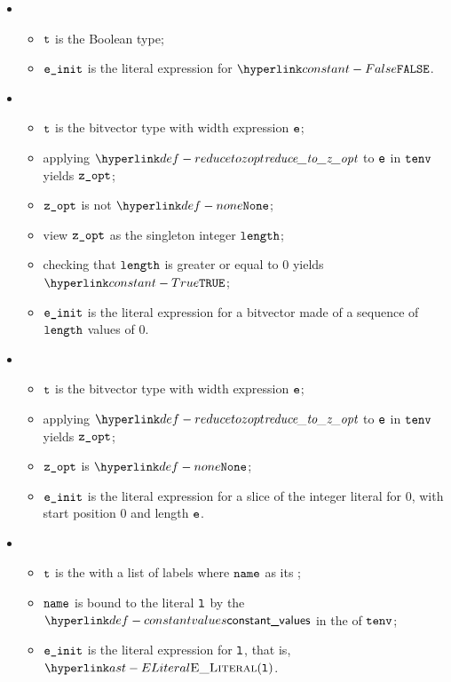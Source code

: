 \ProseParagraph
\OneApplies
\begin{itemize}
    \item {} 
    \begin{itemize}
        \item $\texttt{t}$ is the Boolean type;
        \item $\texttt{e\_init}$ is the literal expression for $\False$.
    \end{itemize}

    \item {} 
    \begin{itemize}
        \item $\texttt{t}$ is the bitvector type with width expression $\texttt{e}$;
        \item applying $\reducetozopt$ to $\texttt{e}$ in $\texttt{tenv}$ yields $\texttt{z\_opt}$;
        \item $\texttt{z\_opt}$ is not $\None$;
        \item view $\texttt{z\_opt}$ as the singleton integer $\texttt{length}$;
        \item checking that $\texttt{length}$ is greater or equal to $0$ yields $\True$\ProseTerminateAs{\NoBaseValue};
        \item $\texttt{e\_init}$ is the literal expression for a bitvector made of a sequence of $\texttt{length}$ values of $0$.
    \end{itemize}

    \item {}
    \begin{itemize}
        \item $\texttt{t}$ is the bitvector type with width expression $\texttt{e}$;
        \item applying $\reducetozopt$ to $\texttt{e}$ in $\texttt{tenv}$ yields $\texttt{z\_opt}$;
        \item $\texttt{z\_opt}$ is $\None$;
        \item $\texttt{e\_init}$ is the literal expression for a slice of the integer literal for $0$, with start position $0$ and length $\texttt{e}$.
    \end{itemize}

    \item {} 
    \begin{itemize}
        \item $\texttt{t}$ is the \enumerationtypeterm{} with a list of labels where $\texttt{name}$ as its \head;
        \item $\texttt{name}$ is bound to the literal $\texttt{l}$ by the $\constantvalues$ in the \globalstaticenvironmentterm{} of $\texttt{tenv}$;
        \item $\texttt{e\_init}$ is the literal expression for $\texttt{l}$, that is, $\eliteral{\vl}$.
    \end{itemize}


\end{itemize}
